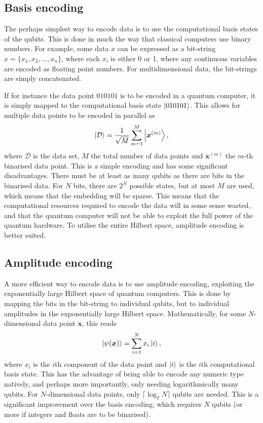 \subsection{Basis encoding}
The perhaps simplest way to encode data is to use the computational basis states of the qubits. This is done in much the way that classical computers use binary numbers. For example, some data $x$ can be expressed as a bit-string $x = \{x_1, x_2, \dots, x_n\}$, where each $x_i$ is either 0 or 1, where any continuous variables are encoded as floating point numbers. For multidimensional data, the bit-strings are simply concatenated.

If for instance the data point $010101$ is to be encoded in a quantum computer, it is simply mapped to the computational basis state $\ket{010101}$. This allows for multiple data points to be encoded in parallel as
\begin{equation}
    \ket{\mathcal{D}} = \frac{1}{\sqrt M} \sum_{m=1}^M \ket{\bm{x}^{(m)}},
\end{equation}
where $\mathcal{D}$ is the data set, $M$ the total number of data points and $\bm{x}^{(m)}$ the $m$-th binarised data point. This is a simple encoding and has some significant disadvantages. There must be at least as many qubits as there are bits in the binarised data. For $N$ bits, there are $2^N$ possible states, but at most $M$ are used, which means that the embedding will be sparse. This means that the computational resources required to encode the data will in some sense wasted, and that the quantum computer will not be able to exploit the full power of the quantum hardware. To utilise the entire Hilbert space, amplitude encoding is better suited.

\subsection{Amplitude encoding}
A more efficient way to encode data is to use amplitude encoding, exploiting the exponentially large Hilbert space of quantum computers. This is done by mapping the bits in the bit-string to individual qubits, but to individual amplitudes in the exponentially large Hilbert space. Mathematically, for some $N$-dimensional data point $\bm{x}$, this reads
\begin{equation}
    \ket{\psi(\bm{x})} = \sum_{i=1}^{N} x_i \ket{i},
\end{equation}
where $x_i$ is the $i$th component of the data point and $\ket{i}$ is the $i$th computational basis state. This has the advantage of being able to encode any numeric type natively, and perhaps more importantly, only needing logarithmically many qubits. For $N$-dimensional data points, only $\lceil \log_2 N \rceil$ qubits are needed. This is a significant improvement over the basis encoding, which requires $N$ qubits (or more if integers and floats are to be binarised).

